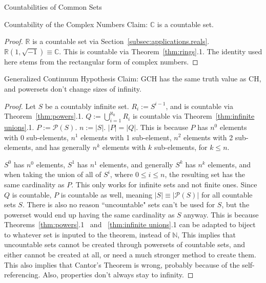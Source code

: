 \documentclass[12pt]{article}
\begin{document}
\begin{section}{Countabilities of Common Sets}
	\begin{subsection}{Countability of the Complex Numbers}\label{subsec:applications.complex}
		Claim: $\mathbb C$ is a countable set.
		\begin{proof}
			$\mathbb R$ is a countable set via Section~\ref{subsec:applications.reals}.
			$\mathbb R(1, \sqrt{-1})\equiv\mathbb C$. This is countable via Theorem~\ref{thm:rings}.1.
			The identity used here stems from the rectangular form of complex numbers.
		\end{proof}
	\end{subsection}
\end{section}

\begin{section}{Generalized Continuum Hypothesis}\label{sec:GCH}
	Claim: GCH has the same truth value as CH, and powersets don't change sizes of infinity.
	\begin{proof}
		Let $S$ be a countably infinite set. $R_i := S^{i-1}$, and is countable via
		Theorem~\ref{thm:powers}.1. $\displaystyle Q:=\bigcup_{i=1}^{\aleph_0}R_i$ is countable
		via Theorem~\ref{thm:infinite unions}.1. $P :=\mathcal P(S)$. $n := |S|$. $|P|=|Q|$.
		This is because $P$ has
		$n^0$ elements with 0 sub-elements,
		$n^1$ elements with 1 sub-element,
		$n^2$ elements with 2 sub-elements, and has generally
		$n^k$ elements with $k$ sub-elements, for $k\leqslant n$.

		$S^0$ has $n^0$ elements,
		$S^1$ has $n^1$ elements, and generally
		$S^k$ has $n^k$ elements, and when taking the union of all of $S^i$, where
		$0\leqslant i\leqslant n$, the resulting set has the same cardinality as $P$. This only
		works for infinite sets and not finite ones. Since $Q$ is countable, $P$ is countable as
		well, meaning $|S|\equiv|\mathcal P(S)|$ for all countable sets $S$. There is also no
		reason ``uncountable" sets can't be used for $S$, but the powerset would end up having
		the same cardinality as $S$ anyway. This is because Theorems~\ref{thm:powers}.1~ and~
		\ref{thm:infinite unions}.1 can be adapted to biject to whatever set is inputed to the
		theorem, instead of $\mathbb N$, This implies that uncountable sets cannot be created
		through powersets of countable sets, and either cannot be created at all, or need a much
		stronger method to create them. This also implies that Cantor's Theorem is wrong, probably
		because of the self-referencing. Also, properties don't always stay to infinity.
	\end{proof}
\end{section}
\end{document}
